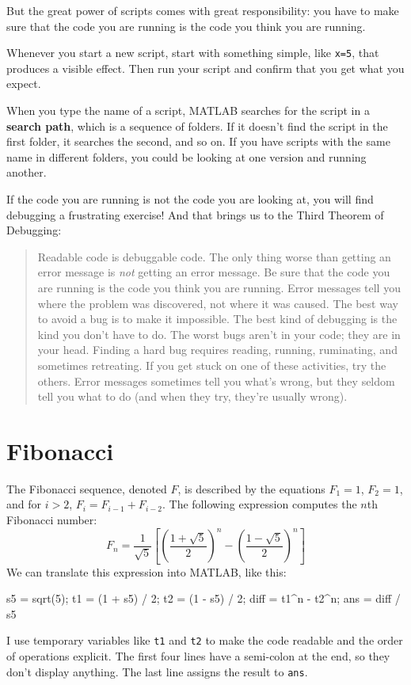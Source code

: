 \documentclass[
]{book}
\numberwithin{Answer}{chapter}
\numberwithin{Exercise}{chapter}
\newcommand{\displaythrm}[1]{%
    \ifthenelse{\equal{#1}{1}}%
        {Readable code is debuggable code.}{%
    \ifthenelse{\equal{#1}{2}}%
        {The only thing worse than getting an error message is {\em
         not} getting an error message.}{%
    \ifthenelse{\equal{#1}{3}}%
        {Be sure that the code you are running
         is the code you think you are running.}{%
    \ifthenelse{\equal{#1}{4}}%
        {Error messages tell you where the problem was discovered,
         not where it was caused.}{%
    \ifthenelse{\equal{#1}{5}}%
        {The best way to avoid a bug is to make it impossible.}{%
    \ifthenelse{\equal{#1}{6}}%
        {The best kind of debugging is the kind you don't have to do.}{%
    \ifthenelse{\equal{#1}{7}}%
        {The worst bugs aren't in your code; they are in your head.}{%
    \ifthenelse{\equal{#1}{8}}%
        {Finding a hard bug requires reading, running, ruminating,
         and sometimes retreating.  If you get stuck on one of these
         activities, try the others.}{%
    \ifthenelse{\equal{#1}{9}}%
        {Error messages sometimes tell you what's wrong, but they
         seldom tell you what to do (and when they try, they're usually
         wrong).}{%
    {}%
}}}}}}}}}}%
\begin{document}
But the great power of scripts comes with great responsibility:
you have to make sure that the code you are running is the code you think you are running.

Whenever you start a new script, start with something simple,
like {\tt x=5}, that produces a visible effect.  Then run your script
and confirm that you get what you expect.

When you type the name of a script, MATLAB searches for the script in a {\bf search path}, which is a sequence of folders.  If it doesn't find the script in the first folder, it searches the second, and so on.
If you have scripts with the same name in different folders, you could be looking at one version and running another.



If the code you are running is not the code you are looking
at, you will find debugging a frustrating exercise!  And that brings
us to the Third Theorem of Debugging:

\begin{quote}
\displaythrm{3}
\end{quote}


\section{Fibonacci}


The Fibonacci sequence, denoted $F$, is described by the equations
$F_1 = 1$, $F_2 = 1$, and for $i > 2$, $F_{i} = F_{i-1} + F_{i-2}$.
The following expression computes the $n$th Fibonacci number:
%
\begin{equation*}
F_n = \frac{1}{\sqrt{5}}
\left[
\left( \frac{1 + \sqrt{5}}{2} \right)^{n} -
\left( \frac{1 - \sqrt{5}}{2} \right)^{n}
\right]
\end{equation*}
%
We can translate this expression into MATLAB, like this:

\begin{code}
s5 = sqrt(5);
t1 = (1 + s5) / 2;
t2 = (1 - s5) / 2;
diff = t1^n - t2^n;
ans = diff / s5
\end{code}

I use temporary variables like {\tt t1} and {\tt t2} to make the code readable and the order of operations explicit.  The first four lines have a semi-colon at the end, so they don't display anything.  The last line assigns the result to {\tt ans}.
\end{document}
